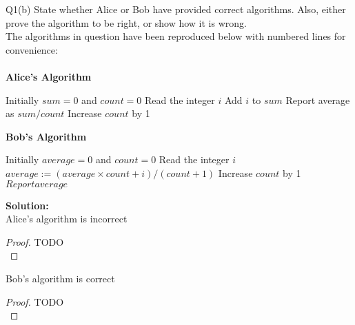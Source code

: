 \begin{problem}
  {Q1(b)}
  State whether Alice or Bob have provided correct algorithms.
  Also, either prove the algorithm to be right, or show how it is wrong.\\
  The algorithms in question have been reproduced below with numbered lines for convenience: \\
  \vspace{10pt}\\
  \textbf{Alice's Algorithm}
  \begin{algorithmic}[1]
    \STATE Initially $sum = 0$ and $count = 0$
    \STATE Read the integer $i$
    \STATE Add $i$ to $sum$
    \STATE Report average as $sum / count$
    \STATE Increase $count$ by 1
    \ENDWHILE
  \end{algorithmic}
  \vspace{10pt}
  \textbf{Bob's Algorithm}
  \begin{algorithmic}[1]
    \STATE Initially $average = 0$ and $count = 0$
    \STATE Read the integer $i$
    \STATE $average := (average \times count + i) / (count + 1)$
    \STATE Increase $count$ by 1
    \STATE $Report average$
    \ENDWHILE
  \end{algorithmic}
  \textbf{Solution:}\\
  \noindent
  Alice's algorithm is incorrect
  \begin{proof}
    TODO\\
  \end{proof}
  \noindent
  Bob's algorithm is correct
  \begin{proof}
    TODO\\
  \end{proof}
\end{problem}
